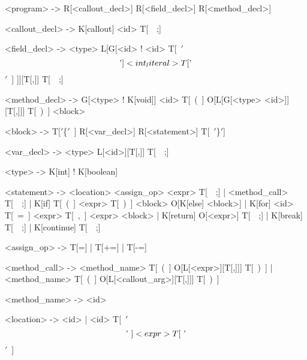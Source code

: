 \begin{bnfgrammar}
<program> -> R[<callout_decl>] R[<field_decl>] R[<method_decl>] 

<callout_decl> -> K[callout] <id> T[~~;]

<field_decl> -> <type> L[G[<id> ! <id> T[~$'$\[$'$] <int_literal> T[$'$\]$'$~] ]][T[,]] T[~~;]

<method_decl> -> G[<type> ! K[void]] <id> T[~(~] O[L[G[<type> <id>]][T[,]]] T[~)~] <block>

<block> -> T[$'$\{$'$~] R[<var_decl>]  R[<statement>] T[~$'$\}$'$]

<var_decl> -> <type> L[<id>][T[,]] T[~~;]

<type> -> K[int] ! K[boolean]

<statement> -> <location> <assign_op> <expr> T[~~;]
             | <method_call> T[~~;]
             | K[if] T[~(~] <expr> T[~)~] <block> O[K[else] <block>]
             | K[for] <id> T[~=~] <expr> T[~,~] <expr> <block>
             | K[return] O[<expr>] T[~~;]
             | K[break] T[~~;]
             | K[continue] T[~~;]

<assign_op> -> T[=]
             | T[+=]
	     | T[-=]	

<method_call> -> <method_name> T[~(~] O[L[<expr>][T[,]]] T[~)~]
        |        <method_name> T[~(~] O[L[<callout_arg>][T[,]]] T[~)~]

<method_name> -> <id>

<location> -> <id>
            | <id> T[~$'$\[$'$~] <expr> T[~$'$\]$'$~]

\end{bnfgrammar}

